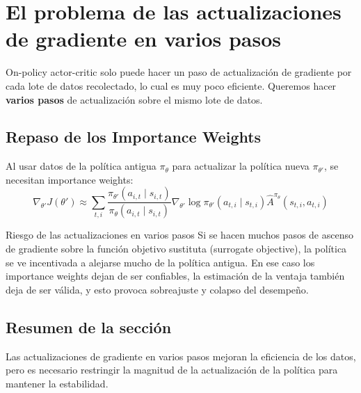 \section{El problema de las actualizaciones de gradiente en varios pasos}

On-policy actor-critic solo puede hacer un paso de actualización de gradiente por cada lote de datos recolectado, lo cual es muy poco eficiente. Queremos hacer \textbf{varios pasos} de actualización sobre el mismo lote de datos.

\subsection{Repaso de los Importance Weights}

Al usar datos de la política antigua $\pi_\theta$ para actualizar la política nueva $\pi_{\theta'}$, se necesitan importance weights:
$$\nabla_{\theta'} J(\theta') \approx \sum_{t,i} \frac{\pi_{\theta'}(a_{i,t} \mid s_{i,t})}{\pi_\theta(a_{i,t} \mid s_{i,t})} \nabla_{\theta'} \log \pi_{\theta'}(a_{t,i} \mid s_{t,i}) \hat{A}^{\pi_\theta}(s_{t,i}, a_{t,i})$$

\begin{warningbox}{Riesgo de las actualizaciones en varios pasos}
Si se hacen muchos pasos de ascenso de gradiente sobre la función objetivo sustituta (surrogate objective), la política se ve incentivada a alejarse mucho de la política antigua. En ese caso los importance weights dejan de ser confiables, la estimación de la ventaja también deja de ser válida, y esto provoca sobreajuste y colapso del desempeño.
\end{warningbox}

\subsection{Resumen de la sección}

Las actualizaciones de gradiente en varios pasos mejoran la eficiencia de los datos, pero es necesario restringir la magnitud de la actualización de la política para mantener la estabilidad.

